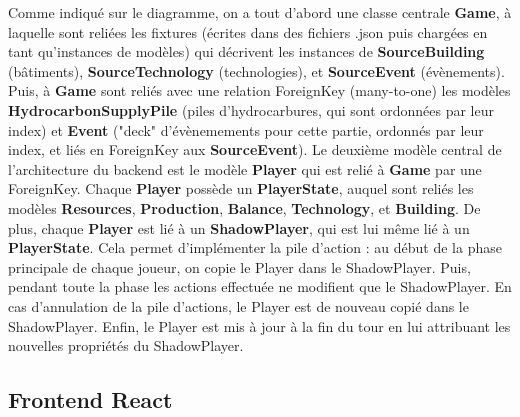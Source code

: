 \documentclass[12pt,twoside,a4paper]{article}
\begin{document}
Comme indiqu\'e sur le diagramme, on a tout d'abord une classe centrale \textbf{Game}, \`a laquelle sont reli\'ees les fixtures (\'ecrites dans des fichiers .json puis charg\'ees en tant qu'instances de mod\`eles) qui d\'ecrivent les instances de \textbf{SourceBuilding} (b\^atiments), \textbf{SourceTechnology} (technologies), et \textbf{SourceEvent} (\'ev\`enements). Puis, \`a \textbf{Game} sont reli\'es avec une relation ForeignKey (many-to-one) les mod\`eles \textbf{HydrocarbonSupplyPile} (piles d'hydrocarbures, qui sont ordonn\'ees par leur index) et \textbf{Event} ("deck" d'\'ev\`enemements pour cette partie, ordonn\'es par leur index, et li\'es en ForeignKey aux \textbf{SourceEvent}). Le deuxi\`eme mod\`ele central de l'architecture du backend est le mod\`ele \textbf{Player} qui est reli\'e \`a \textbf{Game} par une ForeignKey. Chaque \textbf{Player} poss\`ede un \textbf{PlayerState}, auquel sont reli\'es les mod\`eles \textbf{Resources}, \textbf{Production}, \textbf{Balance}, \textbf{Technology}, et \textbf{Building}. De plus, chaque \textbf{Player} est li\'e \`a un \textbf{ShadowPlayer}, qui est lui m\^eme li\'e \`a un \textbf{PlayerState}. Cela permet d'impl\'ementer la pile d'action : au d\'ebut de la phase principale de chaque joueur, on copie le Player dans le ShadowPlayer. Puis, pendant toute la phase les actions effectuée ne modifient que le ShadowPlayer. En cas d'annulation de la pile d'actions, le Player est de nouveau copié dans le ShadowPlayer. Enfin, le Player est mis \`a jour \`a la fin du tour en lui attribuant les nouvelles propriétés du ShadowPlayer.

\subsection{Frontend React}
\end{document}
